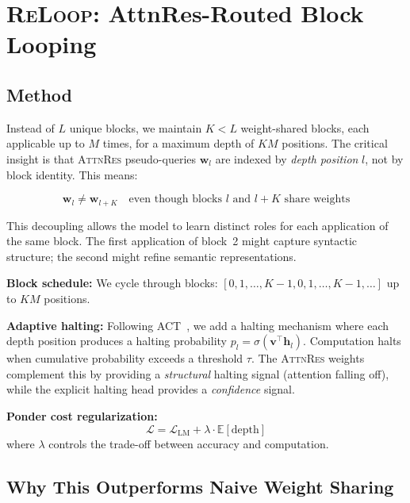 \documentclass{article}
\newcommand{\attnres}{\textsc{AttnRes}}
\newcommand{\reloop}{\textsc{ReLoop}}
\newcommand{\E}{\mathbb{E}}
\begin{document}
\section{\reloop{}: AttnRes-Routed Block Looping}
\label{sec:reloop}

\subsection{Method}

Instead of $L$ unique blocks, we maintain $K < L$ weight-shared blocks, each applicable up to $M$ times, for a maximum depth of $KM$ positions. The critical insight is that \attnres{} pseudo-queries $\mathbf{w}_l$ are indexed by \emph{depth position} $l$, not by block identity. This means:

\begin{equation}
    \mathbf{w}_l \neq \mathbf{w}_{l+K} \quad \text{even though blocks } l \text{ and } l+K \text{ share weights}
\end{equation}

This decoupling allows the model to learn distinct roles for each application of the same block. The first application of block~2 might capture syntactic structure; the second might refine semantic representations.

\textbf{Block schedule:} We cycle through blocks: $[0, 1, \ldots, K{-}1, 0, 1, \ldots, K{-}1, \ldots]$ up to $KM$ positions.

\textbf{Adaptive halting:} Following ACT~\citep{graves2016adaptive}, we add a halting mechanism where each depth position produces a halting probability $p_l = \sigma(\mathbf{v}^\top \mathbf{h}_l)$. Computation halts when cumulative probability exceeds a threshold $\tau$. The \attnres{} weights complement this by providing a \emph{structural} halting signal (attention falling off), while the explicit halting head provides a \emph{confidence} signal.

\textbf{Ponder cost regularization:}
\begin{equation}
    \mathcal{L} = \mathcal{L}_{\text{LM}} + \lambda \cdot \E[\text{depth}]
\end{equation}
where $\lambda$ controls the trade-off between accuracy and computation.

\subsection{Why This Outperforms Naive Weight Sharing}
\end{document}
